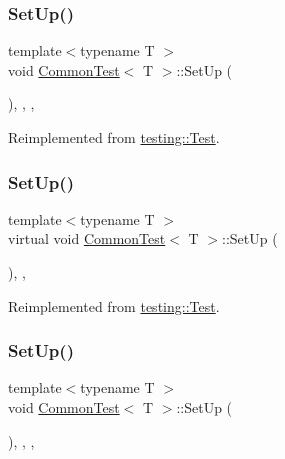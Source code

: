 \subsubsection{\texorpdfstring{SetUp()}{SetUp()}\hspace{0.1cm}{\footnotesize\ttfamily [1/3]}}
{\footnotesize\ttfamily template$<$typename T $>$ \\
void \mbox{\hyperlink{class_common_test}{Common\+Test}}$<$ T $>$\+::Set\+Up (\begin{DoxyParamCaption}{ }\end{DoxyParamCaption})\hspace{0.3cm}{\ttfamily [inline]}, {\ttfamily [override]}, {\ttfamily [protected]}, {\ttfamily [virtual]}}



Reimplemented from \mbox{\hyperlink{classtesting_1_1_test_a190315150c303ddf801313fd1a777733}{testing\+::\+Test}}.

\mbox{\label{class_common_test_a4c7bf7889ce48a9d06530bc4a437f3f5}} 
\subsubsection{\texorpdfstring{SetUp()}{SetUp()}\hspace{0.1cm}{\footnotesize\ttfamily [2/3]}}
{\footnotesize\ttfamily template$<$typename T $>$ \\
virtual void \mbox{\hyperlink{class_common_test}{Common\+Test}}$<$ T $>$\+::Set\+Up (\begin{DoxyParamCaption}{ }\end{DoxyParamCaption})\hspace{0.3cm}{\ttfamily [inline]}, {\ttfamily [protected]}, {\ttfamily [virtual]}}



Reimplemented from \mbox{\hyperlink{classtesting_1_1_test_a190315150c303ddf801313fd1a777733}{testing\+::\+Test}}.

\mbox{\label{class_common_test_a4d98ceceb09fb614ff53e59e0695ea91}} 
\subsubsection{\texorpdfstring{SetUp()}{SetUp()}\hspace{0.1cm}{\footnotesize\ttfamily [3/3]}}
{\footnotesize\ttfamily template$<$typename T $>$ \\
void \mbox{\hyperlink{class_common_test}{Common\+Test}}$<$ T $>$\+::Set\+Up (\begin{DoxyParamCaption}{ }\end{DoxyParamCaption})\hspace{0.3cm}{\ttfamily [inline]}, {\ttfamily [override]}, {\ttfamily [protected]}, {\ttfamily [virtual]}}




